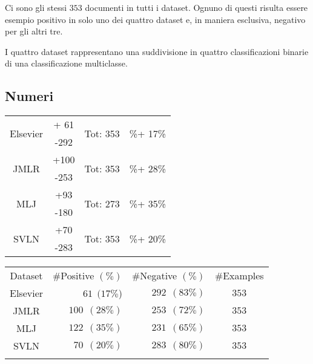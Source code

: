  
Ci sono gli stessi $353$ documenti in tutti i dataset. Ognuno di questi risulta essere esempio positivo in solo uno dei quattro dataset e, in maniera esclusiva, negativo per gli altri tre.

I quattro dataset rappresentano una suddivisione in quattro classificazioni binarie di una classificazione multiclasse.


\subsection{Numeri}

\begin{table}[htbp]
	\centering
	\begin{tabular}{cccc}
		\multirow{2}{*}{Elsevier} & + 61 & \multirow{2}{*}{Tot: 353}& \multirow{2}{*}{\%+ 17\%} \\
		 & -292 &  & \\
		 \multirow{2}{*}{JMLR} & +100 & \multirow{2}{*}{Tot: 353} & \multirow{2}{*}{\%+ 28\%} \\
		 & -253 & & \\
 		 \multirow{2}{*}{MLJ} & +93 & \multirow{2}{*}{Tot: 273} & \multirow{2}{*}{\%+ 35\%} \\
 		 & -180 & & \\
 		 \multirow{2}{*}{SVLN} & +70 & \multirow{2}{*}{Tot: 353} & \multirow{2}{*}{\%+ 20\%} \\
 		 & -283 & & \\
	\end{tabular}%
	\label{tab:}
\end{table}

\begin{table}[htbp]
	\label{tab:datasets}
	\centering
\begin{tabular}{c@{\qquad}r@{\qquad}r@{\qquad}c}
\toprule
\addlinespace
Dataset & \#Positive $(\%)$ & \#Negative $(\%)$ & \#Examples \\
\addlinespace
\midrule
\addlinespace
Elsevier & $61~~(17\%$) & $292~~(83\%)$ & $353$ \\
JMLR     & $100~~(28\%)$ & $253~~(72\%)$ & $353$ \\
MLJ      & $122~~(35\%)$ & $231~~(65\%)$ & $353$ \\
SVLN     & $70~~(20\%)$ & $283~~(80\%)$ & $353$ \\
\addlinespace
\bottomrule
\end{tabular}
\end{table}
